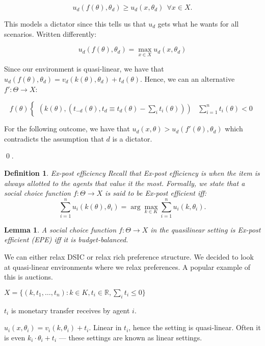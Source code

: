 \documentclass[10pt,a4paper]{article}
\newtheorem{lemma}{Lemma}
\newtheorem{definition}{Definition}
\newcommand{\R}{\ensuremath{\mathbb R}}
\begin{document}
$$
u_d(f(\theta), \theta_d) \geq u_d(x, \theta_d) ~~\forall x \in X.
$$

This models a dictator since this tells us that $u_d$ gets what he wants
for all scenarios. Written differently:

$$
u_d(f(\theta), \theta_d) = \max_{x \in X} u_d(x, \theta_d)
$$

Since our environment is quasi-linear, we have that
$u_d(f(\theta), \theta_d) = v_d(k(\theta), \theta_d) + t_d(\theta)$. Hence, 
we can an alternative $f' : \Theta \rightarrow X$:

$$
f(\theta)
\begin{cases}
(k(\theta), (t_{-d}(\theta), t_d \equiv t_d(\theta)  - \sum_i t_i(\theta))) & \sum_{i=1}^n t_i(\theta) < 0
\end{cases}
$$

For the following outcome, we have that $u_d(x, \theta) > u_d(f'(\theta), \theta_d)$
which contradicts the assumption that $d$ is a dictator.

\qed.



\begin{definition}{Ex-post efficiency}
Recall that Ex-post efficiency is when the item is always allotted to the agents
that value it the most. Formally, we state that a
social choice function $f: \Theta \rightarrow X$ is said to be \emph{Ex-post efficient} iff:
$$
\sum_{i=1}^n u_i(k(\theta), \theta_i) = \arg \max_{k \in K} \sum_{i=1}^n u_i(k, \theta_i).
$$
\end{definition}

\begin{lemma}
A social choice function $f: \Theta \rightarrow X$
in the quasilinear setting is Ex-post efficient (EPE)
iff it is budget-balanced.
\end{lemma}

We can either relax DSIC or relax rich preference structure. We decided
to look at quasi-linear environments where we relax preferences. A popular
example of this is auctions.

$X = \{ (k, t_1, \dots, t_n) : k \in K, t_i \in \R, \sum_i t_i \leq 0 \}$

$t_i$ is monetary transfer receives by agent $i$.

$u_i(x, \theta_i) = v_i(k, \theta_i) + t_i$. Linear in $t_i$, hence
the setting is quasi-linear. Often it is even $k_i \cdot \theta_i + t_i$ --- these
settings are known as linear settings.
\end{document}
